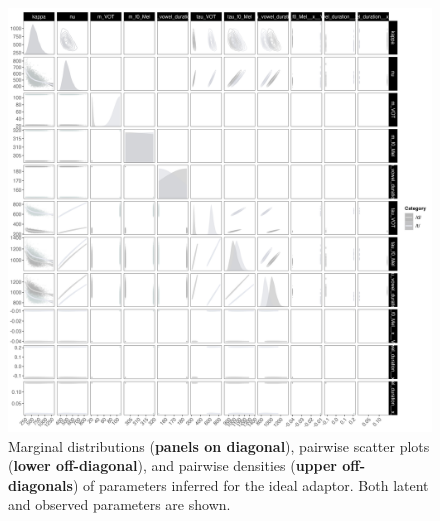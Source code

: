 \documentclass[
  11pt,
  man,mask,floatsintext]{apa6}
\begin{document}
\begin{figure}[H]

{\centering \includegraphics[width=1\linewidth]{../figures/ideal-adaptor-parameter-correlations} 

}

\caption{Marginal distributions (\textbf{panels on diagonal}), pairwise scatter plots (\textbf{lower off-diagonal}), and pairwise densities (\textbf{upper off-diagonals}) of parameters inferred for the ideal adaptor. Both latent and observed parameters are shown.}\label{fig:ideal-adaptor-parameter-correlations}
\end{figure}
\end{document}
